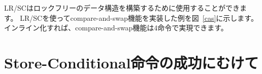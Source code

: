 \begin{comment}
LR/SC can be used to construct lock-free data structures.  An example
using LR/SC to implement a compare-and-swap function is shown in
Figure~\ref{cas}.  If inlined, compare-and-swap functionality need
only take four instructions.
\end{comment}
LR/SCはロックフリーのデータ構造を構築するために使用することができます。 
LR/SCを使ってcompare-and-swap機能を実装した例を図~\ref{cas}に示します。
インライン化すれば、compare-and-swap機能は4命令で実現できます。

\begin{comment}
\section{Eventual Success of Store-Conditional Instructions}
\end{comment}
\section{Store-Conditional命令の成功にむけて}
\label{sec:lrscseq}

\begin{comment}
The standard A extension defines {\em constrained LR/SC loops}, which have
the following properties:
\vspace{-0.2in}
\begin{itemize}
\parskip 0pt
\itemsep 1pt
\item The loop comprises only an LR/SC sequence and code to retry the sequence
  in the case of failure, and must comprise at most 16 instructions placed
  sequentially in memory.
\item An LR/SC sequence begins with an LR instruction and ends with an SC
  instruction.  The dynamic code executed between the LR and SC instructions
  can only contain instructions from the base ``I'' instruction set, excluding
  loads, stores, backward jumps, taken backward branches, JALR, FENCE,
  and SYSTEM instructions.
  If the ``C'' extension is supported, then compressed
  forms of the aforementioned ``I'' instructions are also permitted.
\item The code to retry a failing LR/SC sequence can contain backwards jumps
  and/or branches to repeat the LR/SC sequence, but otherwise has the same
  constraint as the code between the LR and SC.
\item The LR and SC addresses must lie within a memory region with the
  {\em LR/SC eventuality} property.  The execution environment is responsible
  for communicating which regions have this property.
\item The SC must be to the same effective address and of the same data size as
  the latest LR executed by the same hart.
\end{itemize}
\end{comment}

